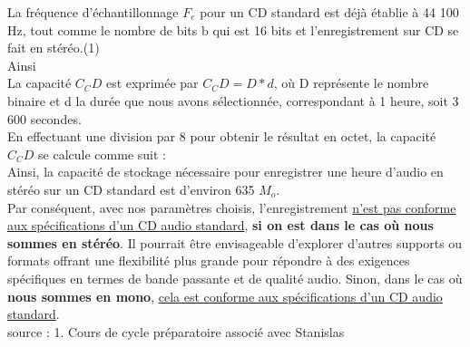 La fréquence d'échantillonnage $F_e$ pour un CD standard est déjà établie à 44 100 Hz, tout comme le nombre de bits b qui est 16 bits et l'enregistrement sur CD se fait en stéréo.(1)
\\
Ainsi 
\\
La capacité $C_CD$ est exprimée par $C_CD = D * d$, où D représente le nombre binaire et d la durée que nous avons sélectionnée, correspondant à 1 heure, soit 3 600 secondes.
\\
En effectuant une division par 8 pour obtenir le résultat en octet, la capacité $C_CD$ se calcule comme suit : 
\\
Ainsi, la capacité de stockage nécessaire pour enregistrer une heure d'audio en stéréo sur un CD standard est d'environ 635 $M_o$.
\\

Par conséquent, avec nos paramètres choisis, l'enregistrement \uline{n'est pas conforme aux spécifications d'un CD audio standard}, \textbf{si on est dans le cas où nous sommes en stéréo}. Il pourrait être envisageable d'explorer d'autres supports ou formats offrant une flexibilité plus grande pour répondre à des exigences spécifiques en termes de bande passante et de qualité audio. Sinon, dans le cas où \textbf{nous sommes en mono}, \uline{cela est conforme aux spécifications d'un CD audio standard}.
\\
\tiny{source :}
1. Cours de cycle préparatoire associé avec Stanislas
\normalsize
